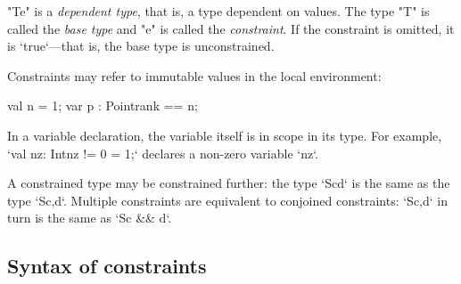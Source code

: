 \xcd"T{e}" is a {\em dependent type}, that is, a type dependent on values. The
type \xcd"T" is called the {\em base type} and \xcd"e" is called the {\em
  constraint}. If the constraint is omitted, it is \xcd`true`---that is, the
  base type is unconstrained.

Constraints may refer to immutable values in the local environment: 
\begin{xten}
     val n = 1;
     var p : Point{rank == n};
\end{xten}
In a variable declaration, the variable itself is in scope in its
type. For example, \xcd`val nz: Int{nz != 0} = 1;` declares a
non-zero variable \xcd`nz`.


A constrained type may be constrained further: the type \xcd`S{c}{d}`
is the same as the type \xcd`S{c,d}`.  Multiple constraints are equivalent to
conjoined constraints: \xcd`S{c,d}` in turn is the same as \xcd`S{c && d}`.

\subsection{Syntax of constraints}
\label{PermittedConstraints}


